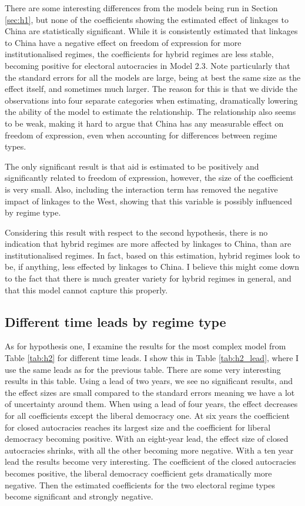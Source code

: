 There are some interesting differences from the models being run in Section \ref{sec:h1}, but none of the coefficients showing the estimated effect of linkages to China are statistically significant. While it is consistently estimated that linkages to China have a negative effect on freedom of expression for more institutionalised regimes, the coefficients for hybrid regimes are less stable, becoming positive for electoral autocracies in Model 2.3. Note particularly that the standard errors for all the models are large, being at best the same size as the effect itself, and sometimes much larger. The reason for this is that we divide the observations into four separate categories when estimating, dramatically lowering the ability of the model to estimate the relationship. The relationship also seems to be weak, making it hard to argue that China has any measurable effect on freedom of expression, even when accounting for differences between regime types.

The only significant result is that aid is estimated to be positively and significantly related to freedom of expression, however, the size of the coefficient is very small. Also, including the interaction term has removed the negative impact of linkages to the West, showing that this variable is possibly influenced by regime type. 

Considering this result with respect to the second hypothesis, there is no indication that hybrid regimes are more affected by linkages to China, than are institutionalised regimes. In fact, based on this estimation, hybrid regimes look to be, if anything, less effected by linkages to China. I believe this might come down to the fact that there is much greater variety for hybrid regimes in general, and that this model cannot capture this properly.

\subsection{Different time leads by regime type}
As for hypothesis one, I examine the results for the most complex model from Table \ref{tab:h2} for different time leads. I show this in Table \ref{tab:h2_lead}, where I use the same leads as for the previous table. There are some very interesting results in this table. Using a lead of two years, we see no significant results, and the effect sizes are small compared to the standard errors meaning we have a lot of uncertainty around them. When using a lead of four years, the effect decreases for all coefficients except the liberal democracy one. At six years the coefficient for closed autocracies reaches its largest size and the coefficient for liberal democracy becoming positive. With an eight-year lead, the effect size of closed autocracies shrinks, with all the other becoming more negative. With a ten year lead the results become very interesting. The coefficient of the closed autocracies becomes positive, the liberal democracy coefficient gets dramatically more negative. Then the estimated coefficients for the two electoral regime types become significant and strongly negative.

